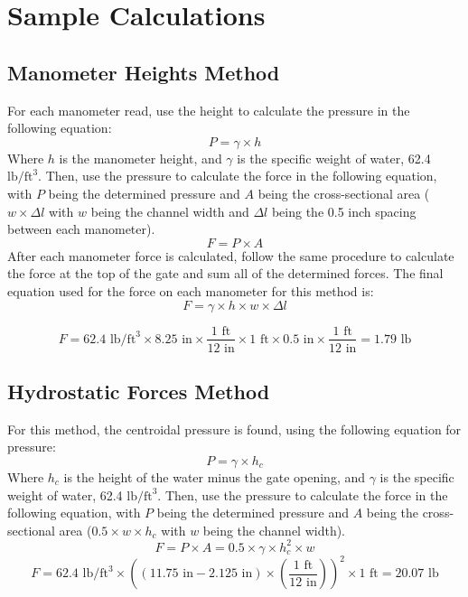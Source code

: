 \documentclass{article}
\begin{document}
\section{Sample Calculations}
\subsection{Manometer Heights Method}
\noindent For each manometer read, use the height to calculate the pressure in the following equation: 
\[P=\gamma\times h\] 
Where $h$ is the manometer height, and $\gamma$ is the specific weight of water, 62.4 $\text{lb}/\text{ft}^3$. Then, use the pressure to calculate the force in the following equation, with $P$ being the determined pressure and $A$ being the cross-sectional area ($w\times \Delta l$ with $w$ being the channel width and $\Delta l$ being the 0.5 inch spacing between each manometer).
\[F=P\times A\] 
After each manometer force is calculated, follow the same procedure to calculate the force at the top of the gate and sum all of the determined forces. The final equation used for the force on each manometer for this method is: 
\[F=\gamma \times h \times w \times \Delta l\]  

\[F=62.4\text{ lb}/\text{ft}^3 \times 8.25\text{ in}\times\frac{1 \text{ ft}}{12\text{ in}}\times 1\text{ ft}\times 0.5\text{ in}\times\frac{1 \text{ ft}}{12\text{ in}}=\boxed{1.79\text{ lb}}\]
\subsection{Hydrostatic Forces Method}
\noindent For this method, the centroidal pressure is found, using the following equation for pressure: 
\[P=\gamma\times h_c\]
Where $h_c$ is the height of the water minus the gate opening, and $\gamma$ is the specific weight of water, 62.4 $\text{lb}/\text{ft}^3$. Then, use the pressure to calculate the force in the following equation, with $P$ being the determined pressure and $A$ being the cross-sectional area ($0.5\times w\times h_c$ with $w$ being the channel width).
\[F=P\times A=0.5\times\gamma\times h_c^2\times w\]
\[F=62.4\text{ lb}/\text{ft}^3\times \left((11.75\text{ in}-2.125\text{ in})\times\left(\frac{1 \text{ ft}}{12\text{ in}}\right)\right)^2\times 1\text{ ft}=\boxed{20.07\text{ lb}}\] 
\newpage
\end{document}
